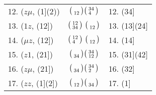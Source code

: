 \documentclass{surv-l}
\numberwithin{equation}{section}
\numberwithin{table}{section}
\numberwithin{figure}{section}
\theoremstyle{plain}
\theoremstyle{definition}
\begin{document}
\begin{table}[]
{\begin{tabular}{@{}|l|c|l|@{}}
12. ($z\mu$, (1](2))&$\big(\kern0.5pt\begin{smallmatrix}\vphantom{12}\\ 12\end{smallmatrix}\kern0.5pt\big) \big(\kern0.5pt\begin{smallmatrix}34 \\ 4\phantom{3}\end{smallmatrix}\kern0.5pt\big)$&12. (34] \\[3pt]
13. ($1z$, (12])&$\big(\kern0.5pt\begin{smallmatrix}12 \\ 34\end{smallmatrix}\kern0.5pt\big)\ \big(\kern0.5pt\begin{smallmatrix}\vphantom{34}\\ 12\end{smallmatrix}\kern0.5pt\big)$&13. (13](24] \\[3pt]
14. ($\mu z$, (12])&$\big(\kern0.5pt\begin{smallmatrix}12 \\ 4\phantom{3}\end{smallmatrix}\kern0.5pt\big)\ \big(\kern0.5pt\begin{smallmatrix}\vphantom{34}\\ 12\end{smallmatrix}\kern0.5pt\big)$&14. (14] \\[3pt]
15. ($z1$, (21])&$\big(\kern0.5pt\begin{smallmatrix} \vphantom{34}\\ 34\end{smallmatrix}\kern0.5pt\big) \big(\kern0.5pt\begin{smallmatrix}34 \\ 12\end{smallmatrix}\kern0.5pt\big)$&15. (31](42] \\[3pt]
16. ($z\mu$, (21])&$\big(\kern0.5pt\begin{smallmatrix}\vphantom{34}\\ 34\end{smallmatrix}\kern0.5pt\big) \big(\kern0.5pt\begin{smallmatrix}34 \\ 2\phantom{3} \end{smallmatrix}\kern0.5pt\big)$&16. (32] \\[3pt]
17. ($zz$, (1](2])&$\big(\kern0.5pt\begin{smallmatrix}\vphantom{12} \\ 12\end{smallmatrix}\kern0.5pt\big) \big(\kern0.5pt\begin{smallmatrix}\vphantom{34}\\ 34\end{smallmatrix}\kern0.5pt\big)$&17. (1] \\[3pt]
\hline
\end{tabular}}{}
\end{table}
\end{document}
